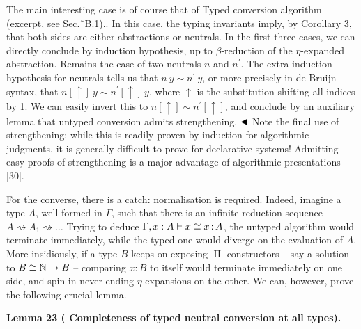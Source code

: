 The main interesting case is of course that of   Typed conversion algorithm (excerpt, see Sec.˜B.1).. In this case, the typing invariants imply, by Corollary 3, that both sides are either abstractions or neutrals. In the first three cases, we can directly conclude by induction hypothesis, up to $\beta$-reduction of the $\eta$-expanded abstraction. Remains the case of two neutrals $n$ and $n^{\prime}$. The extra induction hypothesis for neutrals tells us that $n\ y\sim n^{\prime}\ y$, or more precisely in de Bruijn syntax, that $n\mathord{\left[\uparrow\right]}\ y\sim n^{\prime}\mathord{\left[\uparrow%
\right]}\ y$, where $\uparrow$ is the substitution shifting all indices by 1. We can easily invert this to $n\mathord{\left[\uparrow\right]}\sim n^{\prime}\mathord{\left[\uparrow\right]}$, and conclude by an auxiliary lemma that untyped conversion admits strengthening. $\hfill\blacktriangleleft$ Note the final use of strengthening: while this is readily proven by induction for algorithmic judgments, it is generally difficult to prove for declarative systems! Admitting easy proofs of strengthening is a major advantage of algorithmic presentations [30].\par
 
 
 
For the converse, there is a catch: normalisation is required. Indeed, imagine a type $A$, well-formed in $\Gamma$, such that there is an infinite reduction sequence $A\operatorname{\rightsquigarrow}A_{1}\operatorname{\rightsquigarrow}\dots$ Trying to deduce $\Gamma,x:A\vdash x\mathrel{\raisebox{-0.5pt}{$\cong$}}x\operatorname{\mathrel{%
:}}A$, the untyped algorithm would terminate immediately, while the typed one would diverge on the evaluation of $A$. More insidiously, if a type $B$ keeps on exposing $\operatorname{\Pi}$ constructors – say a solution to $B\mathrel{\raisebox{-0.5pt}{$\cong$}}\operatorname{\mathbb{N}}\to B$ – comparing $x:B$ to itself would terminate immediately on one side, and spin in never ending $\eta$-expansions on the other. We can, however, prove the following crucial lemma.\par
 
 
 
\par\medskip\noindent\textbf{Lemma 23 (  Completeness of typed neutral conversion at all types).}\par
 
